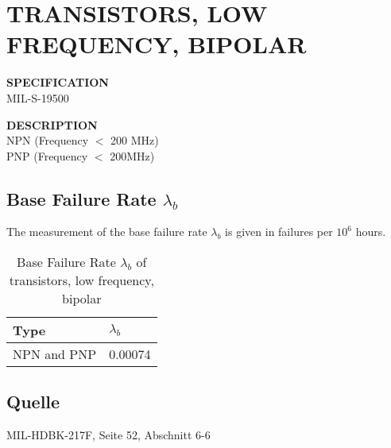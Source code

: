 \section{TRANSISTORS, LOW FREQUENCY, BIPOLAR}

\begin{minipage}[t]{0.29\textwidth}
    \textbf{SPECIFICATION}\\
    MIL-S-19500
\end{minipage}
\begin{minipage}[t]{0.7\textwidth}
    \textbf{DESCRIPTION}\\
    {\fontsize{12pt}{12pt}\selectfont NPN (Frequency $<$ 200 MHz)\\PNP (Frequency $<$ 200MHz)}
\end{minipage}

\subsection{Base Failure Rate $\lambda_b$}
The measurement of the base failure rate $\lambda_b$ is given in failures per $10^6$ hours.
\begin{table}[ht]
{\centering

\begin{tabular}{|p{7.5cm}|p{5cm}|}
    \hline
    \textbf{Type} & \textbf{$\lambda_b$} \\
    \hline
    NPN and PNP & 0.00074 \\
    \hline
\end{tabular}

\caption{Base Failure Rate $\lambda_b$ of transistors, low frequency, bipolar}

\label{tab:bfr_transistors_low_frequency_bipolar}
\par}
\subsection*{Quelle}
MIL-HDBK-217F, Seite 52, Abschnitt 6-6
\end{table}